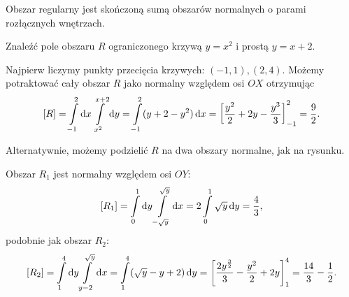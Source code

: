 \begin{definition}
    Obszar regularny jest skończoną sumą obszarów normalnych o parami rozłącznych wnętrzach.
\end{definition}

\begin{example}
    Znaleźć pole obszaru $R$ ograniczonego krzywą $y = x^2$ i prostą $y = x + 2$.
\end{example}
\begin{solution}
    Najpierw liczymy punkty przecięcia krzywych: $(-1, 1), (2, 4)$. Możemy potraktować cały obszar $R$ jako normalny względem osi $OX$ otrzymując
    \[ [R] = \int\limits_{-1}^2 \operatorname{d}\!{x} \int\limits_{x^2}^{x+2} \operatorname{d}\!{y} = \int\limits_{-1}^2 (y + 2 - y^2) \operatorname{d}\!{x} = \left[\frac{y^2}{2} + 2y - \frac{y^3}{3}\right]_{-1}^2 = \frac{9}{2}. \]

    Alternatywnie, możemy podzielić $R$ na dwa obszary normalne, jak na rysunku.
    \begin{center}
    \end{center}
    Obszar $R_1$ jest normalny względem osi $OY$:
    \[ [R_1] = \int\limits_0^1 \operatorname{d}\!{y} \int\limits_{-\sqrt{y}}^{\sqrt{y}} \operatorname{d}\!{x} = 2 \int\limits_0^1 \sqrt{y} \operatorname{d}\!{y} = \frac{4}{3}, \]
    podobnie jak obszar $R_2$:
    \[ [R_2] = \int\limits_1^4 \operatorname{d}\!{y} \int\limits_{y-2}^{\sqrt{y}} \operatorname{d}\!{x} = \int\limits_1^4 (\sqrt{y} - y + 2) \operatorname{d}\!{y} = \left[\frac{2y^{\frac{3}{2}}}{3} - \frac{y^2}{2} + 2y\right]_1^4 = \frac{14}{3} - \frac{1}{2}. \]
\end{solution}

